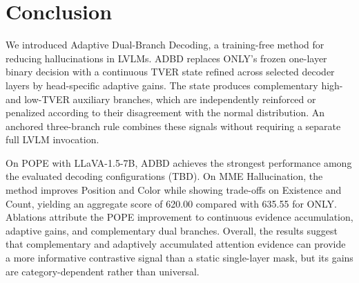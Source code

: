 \section{Conclusion}
\label{sec:conclusion}

We introduced Adaptive Dual-Branch Decoding, a training-free method for reducing hallucinations in LVLMs. ADBD replaces ONLY's frozen one-layer binary decision with a continuous TVER state refined across selected decoder layers by head-specific adaptive gains. The state produces complementary high- and low-TVER auxiliary branches, which are independently reinforced or penalized according to their disagreement with the normal distribution. An anchored three-branch rule combines these signals without requiring a separate full LVLM invocation.

On POPE with LLaVA-1.5-7B, ADBD achieves the strongest performance among the evaluated decoding configurations (TBD). On MME Hallucination, the method improves Position and Color while showing trade-offs on Existence and Count, yielding an aggregate score of 620.00 compared with 635.55 for ONLY. Ablations attribute the POPE improvement to continuous evidence accumulation, adaptive gains, and complementary dual branches. Overall, the results suggest that complementary and adaptively accumulated attention evidence can provide a more informative contrastive signal than a static single-layer mask, but its gains are category-dependent rather than universal.
